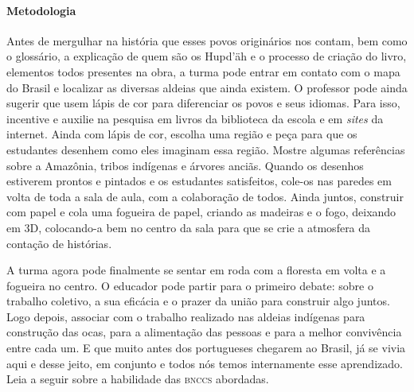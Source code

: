 \documentclass[11pt]{extarticle}
\begin{document}
\paragraph{Metodologia} Antes de mergulhar na história que esses povos originários nos contam, bem como o glossário, a explicação de quem são os Hupd'äh e o processo de criação do livro, elementos todos presentes na obra, a turma pode entrar em contato com o mapa do Brasil e localizar as diversas aldeias que ainda existem. O professor pode ainda sugerir que usem lápis de cor para diferenciar os povos e seus idiomas. Para isso, incentive e auxilie na pesquisa em livros da biblioteca da escola e em \textit{sites} da internet. Ainda com lápis de cor, escolha uma região e peça para que os estudantes desenhem como eles imaginam essa região. Mostre algumas referências sobre a Amazônia, tribos indígenas e árvores anciãs. Quando os desenhos estiverem prontos e pintados e os estudantes satisfeitos, cole-os nas paredes em volta de toda a sala de aula, com a colaboração de todos. Ainda juntos, construir com papel e cola uma fogueira de papel, criando as madeiras e o fogo, deixando em 3D, colocando-a bem no centro da sala para que se crie a atmosfera da contação de histórias.



A turma agora pode finalmente se sentar em roda com a floresta em volta e a fogueira no centro. O educador pode partir para o primeiro debate: sobre o trabalho coletivo, a sua eficácia e o prazer da união para construir algo juntos. Logo depois, associar com o trabalho realizado nas aldeias indígenas para construção das ocas, para a alimentação das pessoas e para a melhor convivência entre cada um. E que muito antes dos portugueses chegarem ao Brasil, já se vivia aqui e desse jeito, em conjunto e todos nós temos internamente esse aprendizado. Leia a seguir sobre a habilidade das \textsc{bnccs} abordadas.
\end{document}
